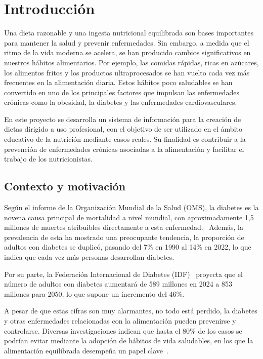 \chapter{Introducción}
Una dieta razonable y una ingesta nutricional equilibrada son bases importantes para mantener la salud y prevenir enfermedades. Sin embargo, a medida que el ritmo de la vida moderna se acelera, se han producido cambios significativos en nuestros hábitos alimentarios. Por ejemplo, las comidas rápidas, ricas en azúcares, los alimentos fritos y los productos ultraprocesados se han vuelto cada vez más frecuentes en la alimentación diaria. Estos hábitos poco saludables se han convertido en uno de los principales factores que impulsan las enfermedades crónicas como la obesidad, la diabetes y las enfermedades cardiovasculares. 

En este proyecto se desarrolla un sistema de información para la creación de dietas dirigido a uso profesional, con el objetivo de ser utilizado en el ámbito educativo de la nutrición mediante casos reales. Su finalidad es contribuir a la prevención de enfermedades crónicas asociadas a la alimentación y facilitar el trabajo de los nutricionistas.

\section{Contexto y motivación}
Según el informe de la Organización Mundial de la Salud (OMS), la diabetes es la novena causa principal de mortalidad a nivel mundial, con aproximadamente 1,5 millones de muertes atribuibles directamente a esta enfermedad.~\cite{who_diabetes_fact_sheet_2025} Además, la prevalencia de esta ha mostrado una preocupante tendencia, la proporción de adultos con diabetes se duplicó, pasando del 7\% en 1990 al 14\% en 2022, lo que indica que cada vez más personas desarrollan diabetes.

Por su parte, la Federación Internacional de Diabetes (IDF)~\cite{idf_diabetes_atlas_2025} proyecta que el número de adultos con diabetes aumentará de 589 millones en 2024 a 853 millones para 2050, lo que supone un incremento del 46\%.

A pesar de que estas cifras son muy alarmantes, no todo está perdido, la diabetes y otras enfermedades relacionadas con la alimentación pueden prevenirse y controlarse. Diversas investigaciones indican que hasta el 80\% de los casos se podrían evitar mediante la adopción de hábitos de vida saludables, en los que la alimentación equilibrada desempeña un papel clave~\cite{harvard_healthy_lifestyle_diabetes_2018}.

